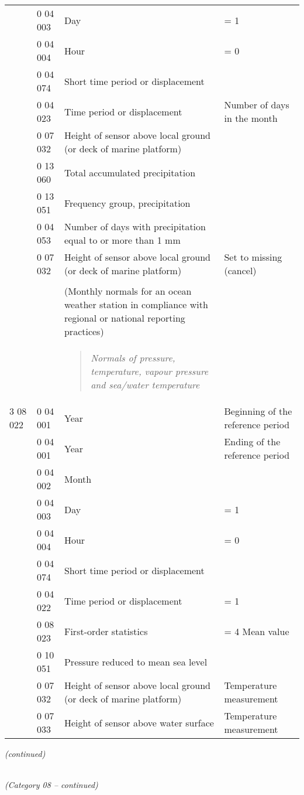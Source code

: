 \begin{longtable}[]{@{}llll@{}}
& 0 04 003 & Day & = 1\tabularnewline
& 0 04 004 & Hour & = 0\tabularnewline
& 0 04 074 & Short time period or displacement &\tabularnewline
& 0 04 023 & Time period or displacement & Number of days in the month\tabularnewline
& 0 07 032 & Height of sensor above local ground (or deck of marine platform) &\tabularnewline
& 0 13 060 & Total accumulated precipitation &\tabularnewline
& 0 13 051 & Frequency group, precipitation &\tabularnewline
& 0 04 053 & Number of days with precipitation equal to or more than 1 mm &\tabularnewline
& 0 07 032 & Height of sensor above local ground (or deck of marine platform) & Set to missing (cancel)\tabularnewline
& & &\tabularnewline
& & (Monthly normals for an ocean weather station in compliance with regional or national reporting practices) &\tabularnewline
\begin{minipage}[t]{0.22\columnwidth}\raggedright
\strut
\end{minipage} & \begin{minipage}[t]{0.22\columnwidth}\raggedright
\strut
\end{minipage} & \begin{minipage}[t]{0.22\columnwidth}\raggedright
\begin{quote}
\emph{Normals of pressure, temperature, vapour pressure and sea/water temperature}
\end{quote}\strut
\end{minipage} & \begin{minipage}[t]{0.22\columnwidth}\raggedright
\strut
\end{minipage}\tabularnewline
3 08 022 & 0 04 001 & Year & Beginning of the reference period\tabularnewline
& 0 04 001 & Year & Ending of the reference period\tabularnewline
& 0 04 002 & Month &\tabularnewline
& 0 04 003 & Day & = 1\tabularnewline
& 0 04 004 & Hour & = 0\tabularnewline
& 0 04 074 & Short time period or displacement &\tabularnewline
& 0 04 022 & Time period or displacement & = 1\tabularnewline
& 0 08 023 & First-order statistics & = 4 Mean value\tabularnewline
& 0 10 051 & Pressure reduced to mean sea level &\tabularnewline
& 0 07 032 & Height of sensor above local ground (or deck of marine platform) & Temperature measurement\tabularnewline
& 0 07 033 & Height of sensor above water surface & Temperature measurement\tabularnewline
\bottomrule
\end{longtable}

\emph{(continued)}

\emph{\\
(Category 08 -- continued)}

